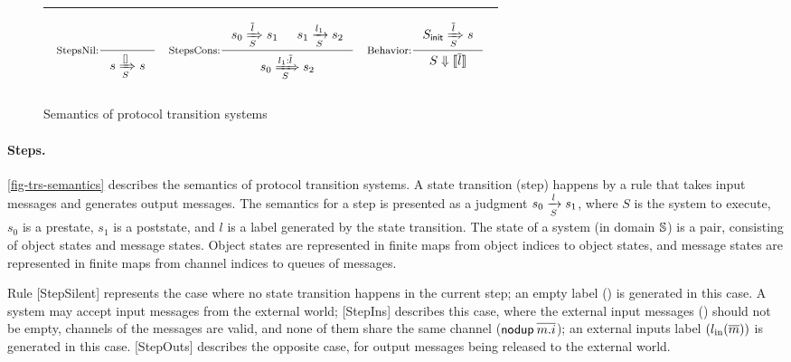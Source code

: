 \documentclass[sigplan,10pt,review,anonymous,screen]{acmart}\settopmatter{printfolios=true,printccs=false,printacmref=false}
\begin{document}
\begin{figure*}[t]
\begin{tabular}{|c|}
\begin{math}
\begin{array}{ccc}
        \mbox{}\vspace{-5pt} \\ %
        \inference[StepsNil:]{}{\semsteps{S}{s}{\listnil{}}{s}} &
        \inference[StepsCons:]{\semsteps{S}{s_0}{\listof{l}}{s_1}
          & \semstep{S}{s_1}{l_1}{s_2}}{\semsteps{S}{s_0}{\listcons{l_1}{\listof{l}}}{s_2}} &
        \inference[Behavior:]{\semsteps{S}{\sysInit{S}}{\listof{l}}{s}}{\sembeh{S}{\behOf{\listof{l}}}} \\
        \mbox{}\vspace{-5pt} \\ %
      \end{array}
    \end{math}\\
    \hline
  \end{tabular}
  \caption{Semantics of protocol transition systems}
  \vspace{-10pt}
  \label{fig-trs-semantics}
\end{figure*}

\paragraph{Steps.}
\autoref{fig-trs-semantics} describes the semantics of protocol transition systems.
A state transition (step) happens by a rule that takes input messages and generates output messages.
The semantics for a step is presented as a judgment $\semstep{S}{s_0}{l}{s_1}$, where $S$ is the system to execute, $s_0$ is a prestate, $s_1$ is a poststate, and $l$ is a label generated by the state transition.
The state of a system (in domain $\hsyst{}$) is a pair, consisting of object states and message states.
Object states are represented in finite maps from object indices to object states, and message states are represented in finite maps from channel indices to queues of messages.

Rule [StepSilent] represents the case where no state transition happens in the current step; an empty label (\lblEmpty{}) is generated in this case.
A system may accept input messages from the external world; [StepIns] describes this case, where the external input messages () should not be empty, channels of the messages are valid, and none of them share the same channel ($\nodup{\listof{\idxOf{m}}}$); an external inputs label $(\lblIns{\listof{m}})$ is generated in this case.
[StepOuts] describes the opposite case, for output messages being released to the external world.
\end{document}
